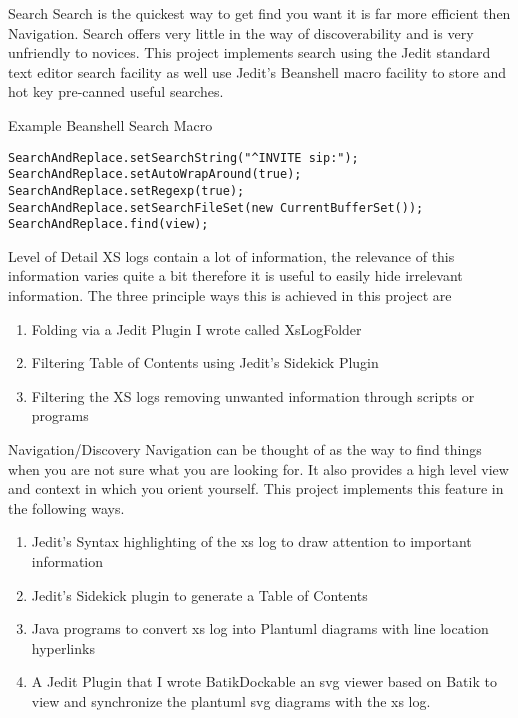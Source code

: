 \documentclass{beamer}
\begin{document}
\begin{frame}{Search}
Search is the quickest way to get find you want it is far more efficient then Navigation.
Search offers very little in the way of discoverability and is very unfriendly to novices. 
This project implements search using the Jedit\cite{Jedit}\cite{Ford08} standard 
text editor search facility as well use Jedit's Beanshell\cite{Beanshell} macro 
facility to store and hot key pre-canned useful searches. 
\end{frame}

\begin{frame}{Example Beanshell Search Macro}
\begin{lstlisting}
SearchAndReplace.setSearchString("^INVITE sip:");
SearchAndReplace.setAutoWrapAround(true);
SearchAndReplace.setRegexp(true);
SearchAndReplace.setSearchFileSet(new CurrentBufferSet());
SearchAndReplace.find(view);
\end{lstlisting}
\end{frame}

\begin{frame}{Level of Detail}
XS logs contain a lot of information, the relevance of this information varies 
quite a bit therefore it is useful to easily hide irrelevant information. 
The three principle ways this is achieved in this project are 

\begin{enumerate}
\item Folding via a Jedit Plugin I wrote called XsLogFolder\cite{XSLogFolder} 
\item Filtering Table of Contents using Jedit's Sidekick Plugin
\item Filtering the XS logs removing unwanted information through scripts or programs
\end{enumerate}
\end{frame}

\begin{frame}{Navigation/Discovery}
Navigation can be thought of as the way to find things when you are not sure 
what you are looking for. It also provides a high level view and context in which you orient yourself. This project implements this feature in the following ways.

\begin{enumerate}
\item Jedit's Syntax highlighting of the xs log to draw attention to important information
\item Jedit's Sidekick plugin to generate a Table of Contents
\item Java programs\cite{XsLogToPlant} \cite{XsEventsToPlant} to convert xs log into Plantuml\cite{Plantuml} diagrams with line location hyperlinks
\item A Jedit Plugin that I wrote BatikDockable\cite{BatikDockable} an svg viewer based on Batik\cite{Batik} to view and synchronize the plantuml svg diagrams with the xs log.
\end{enumerate}

\end{frame}
\end{document}
